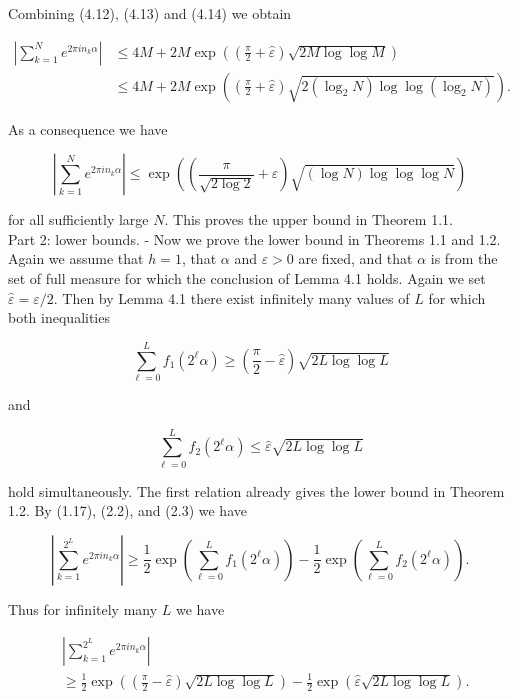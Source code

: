 \documentclass[10pt]{article}
\newcommand{\1}{\mathbf{1}}
\begin{document}
Combining (4.12), (4.13) and (4.14) we obtain

$$
\begin{aligned}
\left|\sum_{k=1}^{N} e^{2 \pi i n_{k} \alpha}\right| & \leqslant 4 M+2 M \exp \left(\left(\frac{\pi}{2}+\hat{\varepsilon}\right) \sqrt{2 M \log \log M}\right) \\
& \leqslant 4 M+2 M \exp \left(\left(\frac{\pi}{2}+\hat{\varepsilon}\right) \sqrt{2\left(\log _{2} N\right) \log \log \left(\log _{2} N\right)}\right) .
\end{aligned}
$$

As a consequence we have

$$
\left|\sum_{k=1}^{N} e^{2 \pi i n_{k} \alpha}\right| \leqslant \exp \left(\left(\frac{\pi}{\sqrt{2\log 2}}+\varepsilon\right) \sqrt{(\log N) \log \log \log N}\right)
$$

for all sufficiently large $N$. This proves the upper bound in Theorem 1.1.\\
Part 2: lower bounds. - Now we prove the lower bound in Theorems 1.1 and 1.2. Again we assume that $h=1$, that $\alpha$ and $\varepsilon>0$ are fixed, and that $\alpha$ is from the set of full measure for which the conclusion of Lemma 4.1 holds. Again we set $\hat{\varepsilon}=\varepsilon / 2$. Then by Lemma 4.1 there exist infinitely many values of $L$ for which both inequalities

$$
\sum_{\ell=0}^{L} f_{1}\left(2^{\ell} \alpha\right) \geqslant\left(\frac{\pi}{2}-\hat{\varepsilon}\right) \sqrt{2 L \log \log L}
$$

and

$$
\sum_{\ell=0}^{L} f_{2}\left(2^{\ell} \alpha\right) \leqslant \hat{\varepsilon} \sqrt{2 L \log \log L}
$$

hold simultaneously. The first relation already gives the lower bound in Theorem 1.2. By (1.17), (2.2), and (2.3) we have

$$
\left|\sum_{k=1}^{2^{L}} e^{2 \pi i n_{k} \alpha}\right| \geqslant \frac{1}{2} \exp \left(\sum_{\ell=0}^{L} f_{1}\left(2^{\ell} \alpha\right)\right)-\frac{1}{2} \exp \left(\sum_{\ell=0}^{L} f_{2}\left(2^{\ell} \alpha\right)\right) .
$$

Thus for infinitely many $L$ we have


\begin{align*}
& \left|\sum_{k=1}^{2^{L}} e^{2 \pi i n_{k} \alpha}\right|  \tag{4.15}\\
& \geqslant \frac{1}{2} \exp \left(\left(\frac{\pi}{2}-\hat{\varepsilon}\right) \sqrt{2 L \log \log L}\right)-\frac{1}{2} \exp (\hat{\varepsilon} \sqrt{2 L \log \log L}) .
\end{align*}
\end{document}

